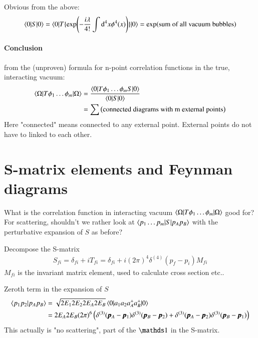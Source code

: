 Obvious from the above:
\begin{align*}
	\braket{0 | S | 0} = \braket{0 | T \{\exp(-\frac{i\lambda}{4!}\int \dd^4 x \phi^4(x))\}|0} = \exp(\text{sum of all vacuum bubbles})
\end{align*}

\paragraph{Conclusion} from the (unproven) formula for n-point correlation functions in the true, interacting vacuum:
\begin{align}
	\braket{\Omega | T \phi_1 \dots \phi_m | \Omega} &= \frac{ \braket{0 | T \phi_1 \dots \phi_m S |0}  }{ \braket{0 | S | 0}} \\
													 &= \sum \left( \text{connected diagrams with m external points} \right)
\end{align}
Here "connected" means connected to any external point. External points do not have to linked to each other.

\section{S-matrix elements and Feynman diagrams}
What is the correlation function in interacting vacuum $\braket{\Omega| T {\phi_1\dots\phi_m} | \Omega}$ good for? For scattering, shouldn't we rather look at $\braket{p_1 \dots p_m | S | p_A p_B}$
with the perturbative expansion of $S$ as before?

Decompose the S-matrix
\begin{align}
	S_{fi} = \delta_{fi} + i T_{fi} = \delta_{fi} + i(2\pi)^4 \delta^{(4)} (p_f-p_i)M_{fi}
\end{align}
$M_{fi}$ is the invariant matrix element, used to calculate cross section etc..

Zeroth term in the expansion of $S$
\begin{align*}
	\braket{ p_1 p_2 | p_A p_B} &= \sqrt{2E_1 2E_2 2E_A 2E_B} \braket{0 | a_1 a_2 a^+_A a^+_B | 0} \\
                               &= 2E_A 2E_B (2\pi)^6 \left( \delta^{(3)}(\pmb{p}_A-\pmb{p}_1) \delta^{(3)}(\pmb{p}_B - \pmb{p}_2) +   \delta^{(3)}(\pmb{p}_A-\pmb{p}_2) \delta^{(3)}(\pmb{p}_B - \pmb{p}_1)\right)
\end{align*}
This actually is "no scattering", part of the $\id$ in the S-matrix.

